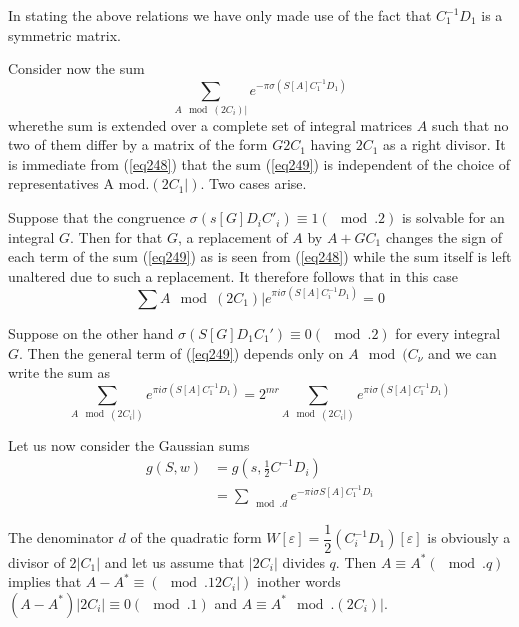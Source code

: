 In stating the above relations we have only made use of the fact that
$C^{-1}_1 D_1$ is a symmetric matrix.  

Consider now the sum 
\begin{equation*}
\sum_{ A \mod (2 C_i)|} e^{ - \pi \sigma ( S [A] C^{-1}_1 D_1)}
\tag{249}\label{eq249}  
\end{equation*}
 where\pageoriginale the sum is extended over a complete set of
 integral matrices $A$ 
 such that no two of them differ by a matrix of the form $G 2 C_1$
 having $2 C_1$ as a right divisor. It is immediate from (\ref{eq248}) that
 the sum (\ref{eq249}) is independent of the choice of representatives A
 mod.$(2 C_1|)$. Two cases arise.  

\medskip
{}
Suppose that the congruence $\sigma (s [G]D_i C'_i) \equiv 1 (\mod
. 2)$ is solvable for an integral $G$. Then for that $G$, a
replacement of $A$ by $A + GC_1$ changes the sign of each term of the
sum (\ref{eq249}) as is seen from (\ref{eq248}) while the sum itself is left
unaltered due to such a replacement. It therefore follows that in this
case  
\begin{equation*}
\sum{A \mod ( 2 C_1)|} e^{\pi i \sigma (S[A]C_i^{-1}D_1)} = 0
\tag{250}\label{eq250}  
\end{equation*}

\medskip
{}
Suppose on the other hand $\sigma ( S[G]D_1 C_1' )\equiv 0 (\mod . 2)$ 
for every integral $G$. Then the general term of (\ref{eq249}) depends only
on $A \mod ( C_\nu $ and we can write the sum as  
\begin{equation*}
\sum_{A\mod (2 C_i| )}e^{\pi i \sigma (S[A]C_1^{-1} D_1) } = 2 ^{m r
}\sum_{A\mod (2 C_i| )}e^{\pi i \sigma (S[A]C_1^{-1} D_1) }
\tag{251}\label{eq251}    
\end{equation*}

Let us now consider the Gaussian sums 
\begin{align*}
g (S, w)& = g (s, \frac{1}{2} C^{-1}D_i) \\
& = \sum_{\mod . d }e^{ - \pi i \sigma S[A] C_1^{-1} D_i} 
\end{align*}


The denominator $d$ of the quadratic form $W [\varepsilon] =
\dfrac{1}{2}(C_i ^{-1} D_1) [\varepsilon]$ is obviously a divisor of
$2 |C_1|$ and let us assume that $|2 C_i| $ divides $q$. Then $A
\equiv A^* (\mod . q)$ implies that $A - A^* \equiv (\mod . 12 C_i |
)$ in\pageoriginale other words $(A - A^*) |2C_i| \equiv 0 (\mod . 1)$
and $A \equiv A^* \mod . (2C_i)|$.   

